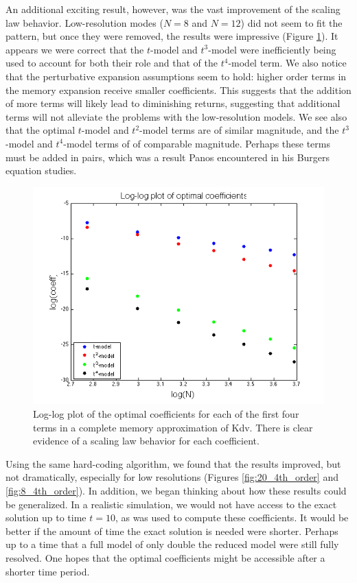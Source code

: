 \documentclass{article}
\begin{document}
An additional exciting result, however, was the vast improvement of the scaling law behavior. Low-resolution modes ($N=8$ and $N=12$) did not seem to fit the pattern, but once they were removed, the results were impressive (Figure \ref{fig:scaling_laws}). It appears we were correct that the $t$-model and $t^3$-model were inefficiently being used to account for both their role and that of the $t^4$-model term. We also notice that the perturbative expansion assumptions seem to hold: higher order terms in the memory expansion receive smaller coefficients. This suggests that the addition of more terms will likely lead to diminishing returns, suggesting that additional terms will not alleviate the problems with the low-resolution models. We see also that the optimal $t$-model and $t^2$-model terms are of similar magnitude, and the $t^3$-model and $t^4$-model terms of of comparable magnitude. Perhaps these terms must be added in pairs, which was a result Panos encountered in his Burgers equation studies.



\begin{figure}[h]
\includegraphics[width=\textwidth]{loglog_2.png}
\caption{Log-log plot of the optimal coefficients for each of the first four terms in a complete memory approximation of Kdv. There is clear evidence of a scaling law behavior for each coefficient.}\label{fig:scaling_laws}
\end{figure}

Using the same hard-coding algorithm, we found that the results improved, but not dramatically, especially for low resolutions (Figures \ref{fig:20_4th_order} and \ref{fig:8_4th_order}). In addition, we began thinking about how these results could be generalized. In a realistic simulation, we would not have access to the exact solution up to time $t=10$, as was used to compute these coefficients. It would be better if the amount of time the exact solution is needed were shorter. Perhaps up to a time that a full model of only double the reduced model were still fully resolved. One hopes that the optimal coefficients might be accessible after a shorter time period.
\end{document}

